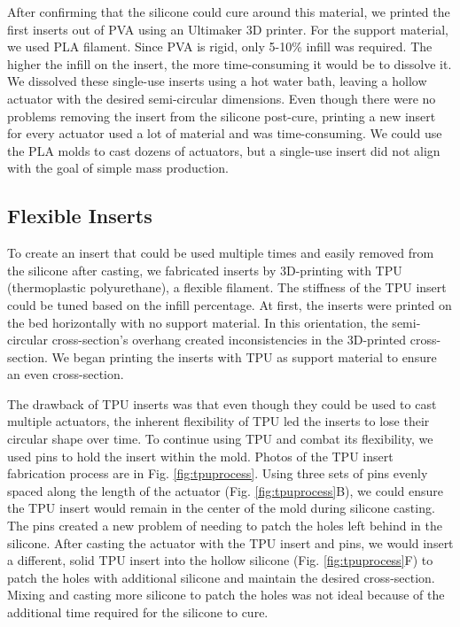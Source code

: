 After confirming that the silicone could cure around this material, we printed the first inserts out of PVA using an Ultimaker 3D printer. For the support material, we used PLA filament. Since PVA is rigid, only 5-10\% infill was required. The higher the infill on the insert, the more time-consuming it would be to dissolve it. We dissolved these single-use inserts using a hot water bath, leaving a hollow actuator with the desired semi-circular dimensions. Even though there were no problems removing the insert from the silicone post-cure, printing a new insert for every actuator used a lot of material and was time-consuming. We could use the PLA molds to cast dozens of actuators, but a single-use insert did not align with the goal of simple mass production.

\subsection{Flexible Inserts}

To create an insert that could be used multiple times and easily removed from the silicone after casting, we fabricated inserts by 3D-printing with TPU (thermoplastic polyurethane), a flexible filament. The stiffness of the TPU insert could be tuned based on the infill percentage. At first, the inserts were printed on the bed horizontally with no support material. In this orientation, the semi-circular cross-section's overhang created inconsistencies in the 3D-printed cross-section. We began printing the inserts with TPU as support material to ensure an even cross-section. 

The drawback of TPU inserts was that even though they could be used to cast multiple actuators, the inherent flexibility of TPU led the inserts to lose their circular shape over time. To continue using TPU and combat its flexibility, we used pins to hold the insert within the mold. Photos of the TPU insert fabrication process are in Fig. \ref{fig:tpuprocess}. Using three sets of pins evenly spaced along the length of the actuator (Fig. \ref{fig:tpuprocess}B), we could ensure the TPU insert would remain in the center of the mold during silicone casting. The pins created a new problem of needing to patch the holes left behind in the silicone. After casting the actuator with the TPU insert and pins, we would insert a different, solid TPU insert into the hollow silicone (Fig. \ref{fig:tpuprocess}F) to patch the holes with additional silicone and maintain the desired cross-section. Mixing and casting more silicone to patch the holes was not ideal because of the additional time required for the silicone to cure. 

